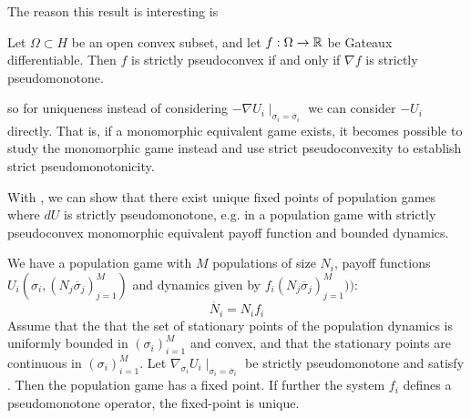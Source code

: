 The reason this result is interesting is
\begin{theorem}
  \label{thm:strictly_pseudoconvex}
  Let $\Omega \subset H$ be an open convex subset, and let $f:\Omega \to \mathbb{R}$ be Gateaux differentiable. Then $f$ is strictly pseudoconvex if and only if $\nabla f$ is strictly pseudomonotone.
\end{theorem}
so for uniqueness instead of considering $-\nabla U_i \mid_{\sigma_i = \overbar{\sigma}_i}$ we can consider $-U_i$ directly. That is, if a monomorphic equivalent game exists, it becomes possible to study the monomorphic game instead and use strict pseudoconvexity to establish strict pseudomonotonicity.

With , we can show that there exist unique fixed points of population games where $dU$ is strictly pseudomonotone, e.g. in a population game with strictly pseudoconvex monomorphic equivalent payoff function and bounded dynamics.
\begin{theorem}
  \label{thm:pop_game_exists_unique}
  We have a population game with $M$ populations of size $N_i$, payoff functions $U_i(\sigma_i, (N_j \overbar{\sigma}_j)_{j=1}^M)$ and dynamics given by $f_i(N_j \overbar{\sigma}_j)_{j=1}^M))$:
  \begin{equation}
    \dot{N_i} = N_i f_i
  \end{equation}
  Assume that the that the set of stationary points of the population dynamics is uniformly bounded in $(\sigma_i)_{i=1}^M$ and convex, and that the stationary points are continuous in $(\sigma_i)_{i=1}^M$. Let $\nabla_{\sigma_i} U_i \mid_{\sigma_i = \overbar{\sigma}_i}$ be strictly pseudomonotone and satisfy . Then the population game has a fixed point.
  If further the system $f_i$ defines a pseudomonotone operator, the fixed-point is unique.
\end{theorem}
